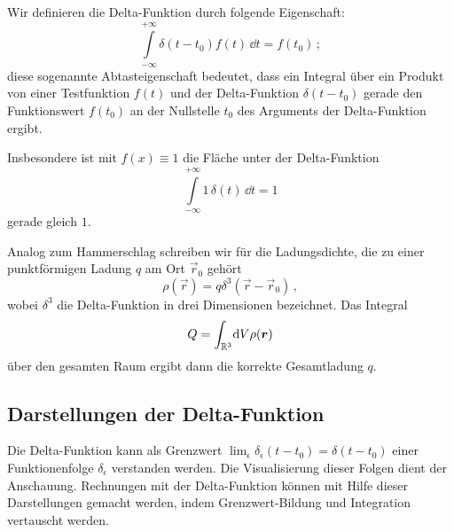 \documentclass[paper=a4, fontsize=11.0pt, abstractoff, DIV12]{scrartcl}
\begin{document}
Wir definieren die Delta-Funktion durch folgende Eigenschaft:
\begin{equation}
\int\limits_{-\infty}^{+\infty} \delta(t-t_0) f(t) \,\dd t = f(t_0)\,;
\label{eq:Abtast}
\end{equation}
diese sogenannte Abtasteigenschaft bedeutet, dass ein Integral über ein
Produkt von einer Testfunktion $f(t)$ und der Delta-Funktion $\delta(t-t_0)$
gerade den Funktionswert $f(t_0)$ an der Nullstelle $t_0$ des Arguments der
Delta-Funktion ergibt.

Insbesondere ist mit $f(x) \equiv 1$ die Fläche unter der Delta-Funktion
\begin{equation}
\int\limits_{-\infty}^{+\infty} 1 \,\delta(t)\,\dd t = 1
\end{equation}
gerade gleich $1$.

Analog zum Hammerschlag schreiben wir für die Ladungsdichte, die zu einer
punktförmigen Ladung $q$ am Ort $\vec r_0$ gehört
\begin{equation}
\rho(\vec r) = q \delta^3(\vec r - \vec r_0)\,,
\end{equation}
wobei $\delta^3$ die Delta-Funktion in drei Dimensionen bezeichnet. Das
Integral
\begin{equation}
Q = \int_{\mathbb{R}^3}\!\mathrm{d} V \rho({\boldsymbol{r}})
\end{equation}
über den gesamten Raum ergibt dann die korrekte Gesamtladung $q$.

\subsection{Darstellungen der Delta-Funktion}

Die Delta-Funktion kann als Grenzwert $\lim_{\epsilon}\delta_\epsilon(t -
t_0) = \delta(t-t_0)$ einer Funktionenfolge $\delta_\epsilon$ verstanden
werden. Die Visualisierung dieser Folgen dient der Anschauung. Rechnungen mit
der Delta-Funktion können mit Hilfe dieser Darstellungen gemacht werden,
indem Grenzwert-Bildung und Integration vertauscht werden.
\end{document}
